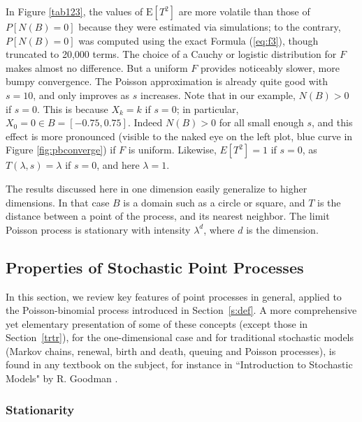 \documentclass[10pt]{article}
\begin{document}
In Figure \ref{tab123}, the values of $\mbox{E}[T^2]$ are more volatile than those of $P[N(B)=0]$ because they were estimated via simulations; to the contrary, $P[N(B)=0]$ was computed using the exact Formula (\ref{eq:f3}), though truncated to 20,000 terms. The choice of a Cauchy or logistic distribution for $F$ makes almost no  difference. But a uniform $F$ provides noticeably slower, more bumpy convergence. The Poisson approximation is already quite good with $s=10$, and only improves as $s$ increases. Note that in our example, $N(B)>0$ if $s=0$. This is because $X_k=k$ if $s=0$; in particular, $X_0=0\in B=[-0.75, 0.75]$. Indeed $N(B)>0$ for all small  enough $s$, and this effect is more pronounced (visible to the naked eye on the left plot, blue curve in Figure \ref{fig:pbconverge}) if $F$ is uniform. Likewise, $E[T^2]=1$ if $s=0$, as $T(\lambda,s)=\lambda$ if $s=0$, and here $\lambda=1$.

The results discussed here in one dimension easily generalize to higher dimensions. In that case $B$ is a domain such as a circle or square, and $T$ is the distance between a point of the process, and its nearest neighbor. The limit Poisson process is stationary with intensity $\lambda^d$, where $d$ is the dimension.

\subsection{Properties of Stochastic Point Processes}\label{stationarity}

In this section, we review key features of point processes in general, applied to the Poisson-binomial process introduced in Section~\ref{s:def}. A more comprehensive yet elementary presentation of some of these concepts (except those in Section~\ref{trtr}), for the one-dimensional case and for traditional stochastic models (Markov chains, renewal, birth and death, queuing and Poisson processes), is found in any textbook on the subject, for instance in ``Introduction to Stochastic Models" by R. Goodman \cite{goodman}.

\subsubsection{Stationarity}
\end{document}
